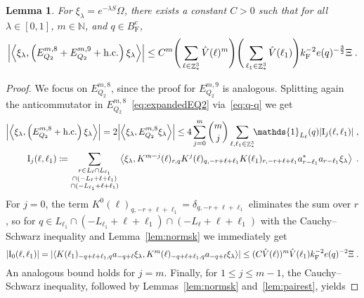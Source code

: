 \documentclass[12pt,a4paper]{article}
\numberwithin{equation}{section}
\newcommand{\NNN}{\mathbb{N}}
\newcommand{\1}{\mathbb{I}}
\newcommand{\F}{\mathrm{F}}
\newcommand{\I}{\mathrm{I}}
\DeclareMathOperator{\Z}{\mathbb{Z}}
\newcommand{\eva}[1]{\left\langle #1 \right\rangle}
\theoremstyle{plain}
\newtheorem{lemma}[theorem]{Lemma}
\theoremstyle{definition}
\theoremstyle{remark}
\theoremstyle{plain}
\theoremstyle{definition}
\theoremstyle{remark}
\begin{document}
\begin{lemma} \label{lem:EQ218}
For $\xi_\lambda = e^{-\lambda S} \Omega$, there exists a constant $ C > 0 $ such that for all $ \lambda \in [0,1] $, $ m \in \NNN $, and $ q \in B_{\F}^c $,
\begin{align}
	\abs{\eva{\xi_\lambda,\left(E^{m,8}_{Q_2}+E^{m,9}_{Q_2}+\mathrm{h.c.}\right) \xi_\lambda }}
	\leq C^m \Bigg(\sum_{\ell \in \Z^3_*} \hat{V}(\ell)^m \Bigg)
		\Bigg(\sum_{\ell_1 \in \Z^3_*} \hat{V}(\ell_1) \Bigg)
		k_{\F}^{-2} e(q)^{-\frac 32} \Xi \;.\label{eq:estEQ218}
\end{align}
\end{lemma}

\begin{proof}
We focus on $ E^{m,8}_{Q_2} $, since the proof for $ E^{m,9}_{Q_2} $ is analogous.
Splitting again the anticommutator in $ E^{m,8}_{Q_2} $~\eqref{eq:expandedEQ2} via~\eqref{eq:q-q} we get
\begin{equation} \label{eq:EQ2181}
\begin{aligned}
	\abs{\eva{\xi_\lambda,\left(E^{m,8}_{Q_2}+\mathrm{h.c.}\right) \xi_\lambda }} 
	= 2\abs{\eva{\xi_\lambda, E^{m,8}_{Q_2} \xi_\lambda }}
	\le 4 \sum_{j=0}^m {{m}\choose j} \sum_{\ell,\ell_1 \in \Z^3_*}\!\! \mathds{1}_{L_\ell}(q) |\I_j(\ell, \ell_1)| \;,\\
	\I_j(\ell, \ell_1)
	\coloneq \sum_{\substack{r\in L_{\ell} \cap L_{\ell_1}\\\cap (-L_{\ell}+\ell+\ell_1) \\ \cap (-L_{\ell_1}+\ell+\ell_1)}}
		\eva{\xi_\lambda, K^{m-j}(\ell)_{r,q} K^{j}(\ell)_{q,-r+\ell+\ell_1} K(\ell_1)_{r,-r+\ell+\ell_1} a^*_{r-\ell_1} a_{r-\ell_1} \xi_\lambda} \;. \\
\end{aligned}
\end{equation}
For $ j = 0 $, the term $ K^0(\ell)_{q,-r+\ell+\ell_1} = \delta_{q,-r+\ell+\ell_1} $ eliminates the sum over $ r $, so for $ q \in L_{\ell_1} \cap (-L_{\ell_1} + \ell + \ell_1) \cap (-L_\ell + \ell + \ell_1) $ with the Cauchy--Schwarz inequality and Lemma~\ref{lem:normsk} we immediately get
\begin{equation}
	|\I_0(\ell, \ell_1)|
	= \abs{\eva{ K(\ell_1)_{-q+\ell+\ell_1,q} a_{-q+\ell} \xi_\lambda, K^m(\ell)_{-q+\ell+\ell_1,q} a_{-q+\ell} \xi_\lambda }}
	\leq (C \hat{V}(\ell))^m
		\hat{V}(\ell_1)
		k_{\F}^{-2} e(q)^{-2} \Xi \;. \label{eq:estEQ2181}
\end{equation}
An analogous bound holds for $ j = m $. Finally, for $ 1 \le j \le m-1 $, the Cauchy--Schwarz inequality, followed by Lemmas~\ref{lem:normsk} and~\ref{lem:pairest}, yields

\end{proof}
\end{document}

